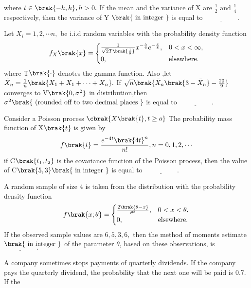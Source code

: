 where $t\in\brak{-h,h},h>0.$ If the mean and the variance of  X are $\frac{1}{2} \text{ and }\frac{1}{4}$ respectively, then the variance of Y $\brak{\text{ in integer }}$ is equal to $\underline{\hspace{2cm}}.$
\bigskip
\item Let $X_{i}=1,2,\cdots n,$ be i.i.d random variables with the probability density function 
\begin{align*}
    f_{X}\brak{x} = 
\begin{cases} 
\frac{1}{\sqrt{2}T\brak{\frac{1}{6}}}x^{-\frac{5}{6}}e^{-\frac{x}{8}}, & 0 < x < \infty, \\
0, & \text{elsewhere}.
\end{cases}
\end{align*}
where T$\brak{\cdot}$ denotes the gamma function. Also ,let $\Bar{X}_{n}=\frac{1}{n}\brak{X_{1}+X_{1}+\cdots+X_{n}}.$ If $\sqrt{n}\brak{\Bar{X}_{n}\brak{3-\Bar{X}_{n}}-\frac{20}{9}}$ converges to V$\brak{0,\sigma^{2}}$ in distribution,then $\sigma^{2} \brak{\text{ (rounded
off to two decimal places }}$ is equal to $\underline{\hspace{2cm}}.$
\bigskip
\item Consider a Poisson process $\cbrak{X\brak{t},t\geq o}$
The probability mass function of X$\brak{t}$ is given by 
\begin{align*}
     f\brak{t}=\frac{e^{-4t}\brak{4t}^{n}}{n!}, n=0,1,2,\cdots
\end{align*}
if C$\brak{t_{1},t_{2}}$ is the covariance function of the Poisson process, then the value of C$\brak{5,3} \brak{\text{ in integer }}$ is equal to $\underline{\hspace{2cm}}.$
\bigskip
\item A random sample of size $4$ is taken from the distribution with the probability density function 
\begin{align*}
    f\brak{x;\theta} = 
\begin{cases} 
\frac{2\brak{\theta-x}}{\theta^{2}}, & 0 < x < \theta, \\
0, & \text{elsewhere}.
\end{cases}
\end{align*}
If the observed sample values are $6, 5, 3, 6,$ then the method of moments estimate $\brak{\text{ in integer }}$ of the parameter $\theta$, based on these observations, is $\underline{\hspace{2cm}}.$
\bigskip
\item A company sometimes stops payments of quarterly dividends. If the company pays the quarterly dividend, the probability that the next one will be paid is $0.7.$ If the
